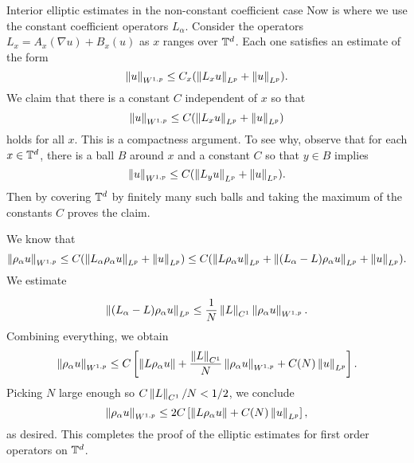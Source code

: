 \documentclass{amsart}
\begin{document}
\begin{clear}{Interior elliptic estimates in the non-constant
    coefficient case}
Now is where we use the constant coefficient operators $L_{\alpha}$. Consider the operators $L_{x}=A_{x}(\nabla u)+B_{x}(u)$ as $x$ ranges over $\mathbb{T}^{d}$. Each one satisfies an estimate of the form
\begin{equation*}
  \left\lVert u\right\rVert_{W^{1,p}}\le C_{x}(\left\lVert L_{x}u\right\rVert_{L^{p}}+\left\lVert u\right\rVert_{L^{p}}).
\end{equation*}
We claim that there is a constant $C$ independent of $x$ so that
\begin{equation*}
  \left\lVert u\right\rVert_{W^{1,p}}\le C(\left\lVert L_{x}u\right\rVert_{L^{p}}+\left\lVert u\right\rVert_{L^{p}})
\end{equation*}
holds for all $x$. This is a compactness argument. To see why, observe that for each $x\in \mathbb{T}^{d}$, there is a ball $B$ around $x$ and a constant $C$ so that $y\in B$ implies
\begin{equation*}
  \left\lVert u\right\rVert_{W^{1,p}}\le C(\left\lVert L_{y}u\right\rVert_{L^{p}}+\left\lVert u\right\rVert_{L^{p}}).
\end{equation*}
Then by covering $\mathbb{T}^{d}$ by finitely many such balls and taking the maximum of the constants $C$ proves the claim.

We know that
\begin{equation*}
  \left\lVert\rho_{\alpha}u\right\rVert_{W^{1,p}}\le C(\left\lVert L_{\alpha}\rho_{\alpha}u\right\rVert_{L^{p}}+\left\lVert u\right\rVert_{L^{p}})\le C(\left\lVert L\rho_{\alpha}u\right\rVert_{L^{p}}+\left\lVert(L_{\alpha}-L)\rho_{\alpha}u\right\rVert_{L^{p}}+\left\lVert u\right\rVert_{L^{p}}).
\end{equation*}
We estimate

\begin{equation*}
  \begin{aligned}
    \left\lVert(L_{\alpha}-L)\rho_{\alpha}u\right\rVert_{L^{p}}\le \frac{1}{N}\left\lVert L\right\rVert_{C^{1}}\left\lVert\rho_{\alpha}u\right\rVert_{W^{1,p}}.
  \end{aligned}
\end{equation*}
Combining everything, we obtain
\begin{equation*}
  \left\lVert\rho_{\alpha}u\right\rVert_{W^{1,p}}\le C\left[\left\lVert L\rho_{\alpha}u\right\rVert+\frac{\left\lVert L\right\rVert_{C^{1}}}{N}\left\lVert\rho_{\alpha}u\right\rVert_{W^{1,p}}+C(N)\left\lVert u\right\rVert_{L^{p}}\right].
\end{equation*}
Picking $N$ large enough so $C\left\lVert L\right\rVert_{C^{1}}/N<1/2$, we conclude
\begin{equation*}
  \left\lVert\rho_{\alpha}u\right\rVert_{W^{1,p}}\le 2C\left[\left\lVert L\rho_{\alpha}u\right\rVert+C(N)\left\lVert u\right\rVert_{L^{p}}\right],
\end{equation*}
as desired. This completes the proof of the elliptic estimates for
first order operators on $\mathbb{T}^{d}$.
\end{clear}
\end{document}
